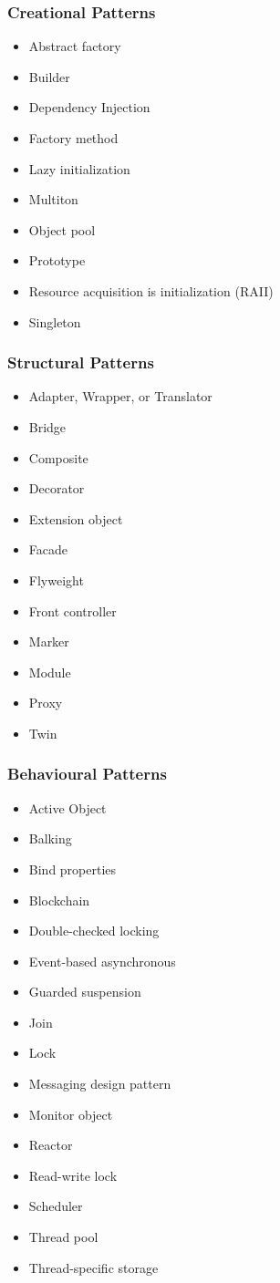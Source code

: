 \subsubsection{Creational Patterns}
\begin{itemize}
	\item Abstract factory
	\item Builder
	\item Dependency Injection
	\item Factory method
	\item Lazy initialization
	\item Multiton
	\item Object pool
	\item Prototype
	\item Resource acquisition is initialization (RAII)
	\item Singleton
\end{itemize}

\subsubsection{Structural Patterns}
\begin{itemize}
	\item Adapter, Wrapper, or Translator
	\item Bridge
	\item Composite
	\item Decorator
	\item Extension object
	\item Facade
	\item Flyweight
	\item Front controller
	\item Marker
	\item Module
	\item Proxy
	\item Twin
\end{itemize}

\subsubsection{Behavioural Patterns}
\begin{itemize}
	\item Active Object
	\item Balking
	\item Bind properties
	\item Blockchain
	\item Double-checked locking
	\item Event-based asynchronous
	\item Guarded suspension
	\item Join
	\item Lock
	\item Messaging design pattern
	\item Monitor object
	\item Reactor
	\item Read-write lock
	\item Scheduler
	\item Thread pool
	\item Thread-specific storage
\end{itemize}

